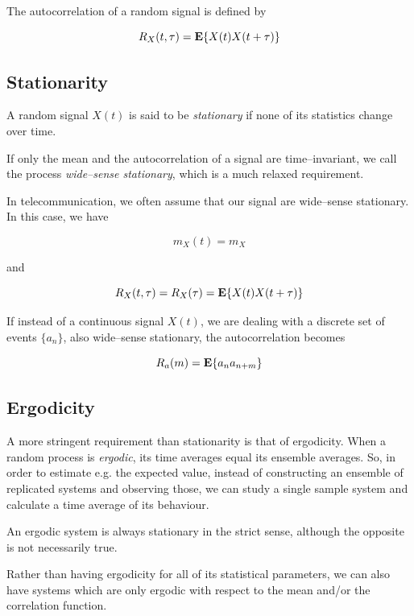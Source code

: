 The autocorrelation of a random signal is defined by

\begin{equation}
R_X(t,\tau) = {\bf E}\{ X(t)X(t+\tau) \}
\end{equation} 

\subsection{Stationarity}

A random signal $X(t)$ is said to be \emph{stationary} if none of its statistics change over time.

If only the mean and the autocorrelation of a signal are time--invariant, we call the process \emph{wide--sense stationary}, which is a much relaxed requirement.

In telecommunication, we often assume that our signal are wide--sense stationary. In this case, we have

\begin{equation}
m_X(t) = m_X
\end{equation} 

and

\begin{equation}
R_X(t,\tau) = R_X(\tau) = {\bf E}\{ X(t) X(t+\tau) \}
\end{equation} 

If instead of a continuous signal $X(t)$, we are dealing with a discrete set of events $\{ a_n \}$, also wide--sense stationary, the autocorrelation becomes

\begin{equation}
R_a(m) = {\bf E}\{ a_n a_{n+m} \}
\end{equation} 

\subsection{Ergodicity}

A more stringent requirement than stationarity is that of ergodicity. When a random process is \emph{ergodic}, its time averages equal its ensemble averages. So, in order to estimate e.g.
the expected value, instead of constructing an ensemble of replicated systems and observing those, we can study a single sample system and calculate a time average of its behaviour.

An ergodic system is always stationary in the strict sense, although the opposite is not necessarily true.

Rather than having ergodicity for all of its statistical parameters, we can also have systems which are only ergodic with respect to the mean and/or the correlation function.

